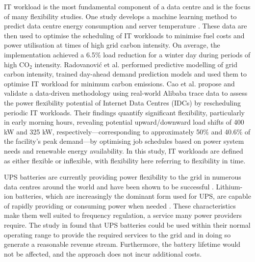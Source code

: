 \documentclass[lettersize,journal]{IEEEtran}
\begin{document}
IT workload is the most fundamental component of a data centre and is the focus of many flexibility studies. One study develops a machine learning method to predict data centre energy consumption and server temperature \cite{Misaghian2023TIA}. These data are then used to optimise the scheduling of IT workloads to minimise fuel costs and power utilisation at times of high grid carbon intensity. On average, the implementation achieved a 6.5\% load reduction for a winter day during periods of high CO$_2$ intensity. Radovanović et al. \cite{radovanovic2022carbon} performed predictive modelling of grid carbon intensity, trained day-ahead demand prediction models and used them to optimise IT workload for minimum carbon emissions.
Cao et al. \cite{Cao2022ApEn} propose and validate a data-driven methodology using real-world Alibaba trace data to assess the power flexibility potential of Internet Data Centres (IDCs) by rescheduling periodic IT workloads. Their findings quantify significant flexibility, particularly in early morning hours, revealing potential upward/downward load shifts of 400 kW and 325 kW, respectively—corresponding to approximately 50\% and 40.6\% of the facility's peak demand—by optimising job schedules based on power system needs and renewable energy availability. In this study, IT workloads are defined as either flexible or inflexible, with flexibility here referring to flexibility in time.

UPS batteries are currently providing power flexibility to the grid in numerous data centres around the world and have been shown to be successful \cite{alapera2019fast,roach2022microsoft,Anghel_2023}. Lithium-ion batteries, which are increasingly the dominant form used for UPS, are capable of rapidly providing or consuming power when needed \cite{alapera2018data}. These characteristics make them well suited to frequency regulation, a service many power providers require. The study in \cite{alapera2018data} found that UPS batteries could be used within their normal operating range to provide the required services to the grid and in doing so generate a reasonable revenue stream. Furthermore, the battery lifetime would not be affected, and the approach does not incur additional costs.
\end{document}
